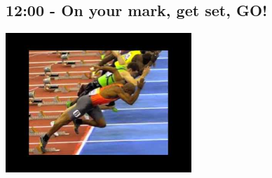 \documentclass[12pt,notes]{beamer}
\begin{document}
\begin{frame}[label={sec:orga145850}]{}
\section{12:00 - On your mark, get set, GO!}

\begin{center}
\includegraphics[width=7cm]{./img/on_your_mark_get_set_go.jpg}
\end{center}
\end{frame}
\end{document}
